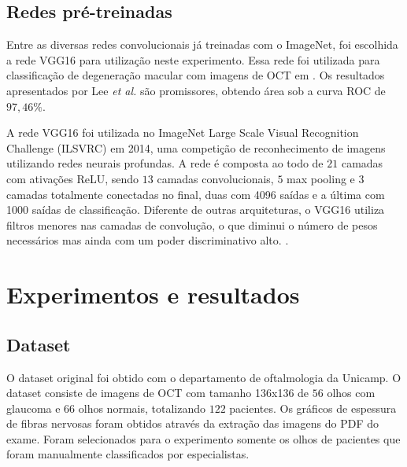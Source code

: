 \documentclass[conference]{IEEEtran}
\begin{document}
  \subsection{Redes pré-treinadas}


  Entre as diversas redes convolucionais já treinadas com o ImageNet, foi escolhida a rede VGG16 para utilização neste experimento. Essa rede foi utilizada para classificação de degeneração macular com imagens de OCT em \cite{lee2017}. Os resultados apresentados por Lee \textit{et al.} são promissores, obtendo área sob a curva ROC de $97,46\%$.

  A rede VGG16 foi utilizada no ImageNet Large Scale Visual Recognition Challenge (ILSVRC) em 2014, uma competição de reconhecimento de imagens utilizando redes neurais profundas. A rede é composta ao todo de $21$ camadas com ativações ReLU, sendo $13$ camadas convolucionais, $5$ max pooling e $3$ camadas totalmente conectadas no final, duas com 4096 saídas e a última com 1000 saídas de classificação. Diferente de outras arquiteturas, o VGG16 utiliza filtros menores nas camadas de convolução, o que diminui o número de pesos necessários mas ainda com um poder discriminativo alto. \cite{simonyan2014}.

\section{Experimentos e resultados}



  \subsection{Dataset}


  O dataset original foi obtido com o departamento de oftalmologia da Unicamp. O dataset consiste de imagens de OCT com tamanho 136x136 de $56$ olhos com glaucoma e $66$ olhos normais, totalizando $122$ pacientes. Os gráficos de espessura de fibras nervosas foram obtidos através da extração das imagens do PDF do exame. Foram selecionados para o experimento somente os olhos de pacientes que foram manualmente classificados por especialistas.
\end{document}
